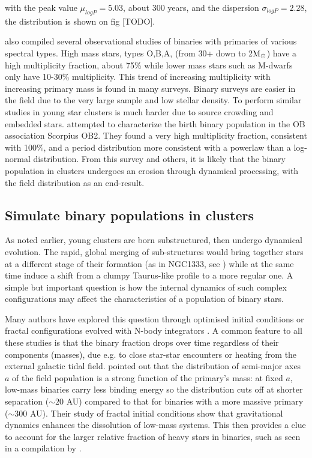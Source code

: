 with the peak value $\mu_{logP} = 5.03$, about 300 years, and the dispersion $\sigma_{logP} = 	2.28$, the distribution is shown on fig [TODO].

\cite{Raghavan2010} also compiled several observational studies of binaries with primaries of various spectral types. High mass stars, types O,B,A, (from 30+ down to 2${\textrm{M}_\odot}$) have a high multiplicity fraction, about 75\%  while lower mass stars such as M-dwarfs only have 10-30\% multiplicity. This trend of increasing multiplicity with increasing primary mass is found in many surveys.
Binary surveys are easier in the field due to the very large sample and low stellar density. To perform similar studies in young star clusters is much harder due to source crowding and embedded stars. \cite{Kouwenhoven2007} attempted to characterize the birth binary population in the OB association Scorpius OB2. They found a very high multiplicity fraction, consistent with 100\%, and a period distribution more consistent with a powerlaw than a log-normal distribution. From this survey and others, it is likely that the binary population in clusters undergoes an erosion through dynamical processing, with the field distribution as an end-result.

\subsection{Simulate binary populations in clusters}

As noted earlier, young clusters are born substructured, then undergo dynamical evolution. The rapid, global  merging of sub-structures would bring together stars at a different stage of their  formation (as in NGC1333, see \citealt{Foster2015}) while at the same time induce a shift from a clumpy Taurus-like profile to a more regular one. A simple but important question is how the internal dynamics of such complex configurations may affect the  characteristics of a population of binary stars. 

Many authors have explored this question through optimised initial conditions \citep{Kroupa2001,Marks2012} or fractal configurations evolved with N-body integrators \citep{goodwin2004,Allison2009,Parker2011,Parker2014}. A common feature to all these studies is that the binary fraction drops over time regardless of their components (masses), due e.g. to close star-star encounters or heating from the external galactic tidal field. \cite{Parker2014} pointed out that the distribution of semi-major axes $a$ of the field population is a strong function of the primary's mass: at fixed $a$, low-mass binaries carry less binding energy so the distribution cuts off at shorter separation ($\sim 20 $ AU) compared to that for binaries with a more massive primary ($\sim 300$ AU). Their study of fractal initial conditions show that gravitational dynamics enhances the dissolution of low-mass systems. This then provides a clue to account for the larger relative fraction of heavy stars in binaries, such as seen in a compilation by \cite{Raghavan2010}. 
 
